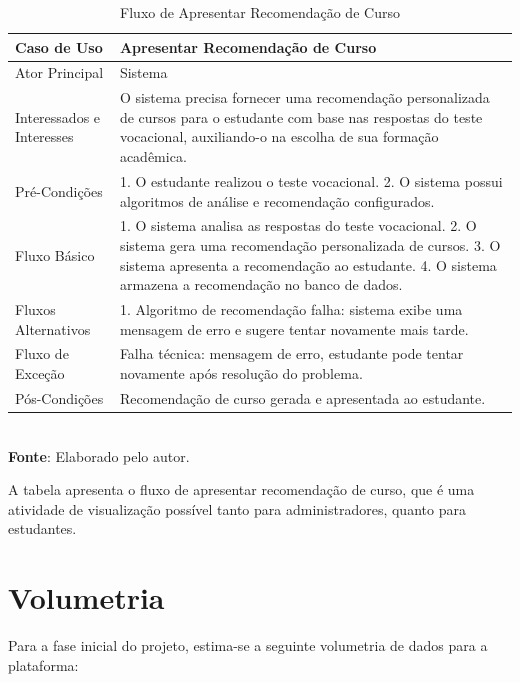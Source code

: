 \begin{table}[h!]
\centering
\caption{Fluxo de Apresentar Recomendação de Curso}
\begin{tabular}{|m{4cm}|m{11cm}|}
\hline
\textbf{Caso de Uso}   & \textbf{Apresentar Recomendação de Curso} \\
\hline
Ator Principal & Sistema\\
\hline
Interessados e Interesses & O sistema precisa fornecer uma recomendação personalizada de cursos para o estudante com base nas respostas do teste vocacional, auxiliando-o na escolha de sua formação acadêmica. \\
\hline
Pré-Condições & 

1. O estudante realizou o teste vocacional.
2. O sistema possui algoritmos de análise e recomendação configurados. \\
\hline
Fluxo Básico & 
1. O sistema analisa as respostas do teste vocacional.
2. O sistema gera uma recomendação personalizada de cursos.
3. O sistema apresenta a recomendação ao estudante.
4. O sistema armazena a recomendação no banco de dados.
\\
\hline
Fluxos Alternativos & 

1. Algoritmo de recomendação falha: sistema exibe uma mensagem de erro e sugere tentar novamente mais tarde.
\\
\hline
Fluxo de Exceção & Falha técnica: mensagem de erro, estudante pode tentar novamente após resolução do problema. \\
\hline
Pós-Condições & Recomendação de curso gerada e apresentada ao estudante.\\
\hline
\end{tabular}
\label{table:casos-de-uso}
\\[1ex]
\footnotesize \textbf{Fonte}: Elaborado pelo autor.
\end{table}

A tabela apresenta o fluxo de apresentar recomendação de curso, que é uma atividade de visualização possível tanto para administradores, quanto para estudantes.
\newpage

\clearpage

\section{Volumetria}

Para a fase inicial do projeto, estima-se a seguinte volumetria de dados para a plataforma:

